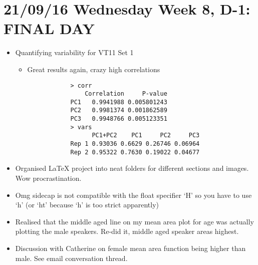 \documentclass{article}
\begin{document}
\section*{21/09/16 Wednesday Week 8, D-1: FINAL DAY}
\begin{itemize}
    \item Quantifying variability for VT11 Set 1
    \begin{itemize}
        \item Great results again, crazy high correlations\begin{verbatim}
            > corr
                Correlation     P-value
            PC1   0.9941988 0.005801243
            PC2   0.9981374 0.001862589
            PC3   0.9948766 0.005123351
            > vars
                  PC1+PC2    PC1     PC2     PC3
            Rep 1 0.93036 0.6629 0.26746 0.06964
            Rep 2 0.95322 0.7630 0.19022 0.04677
        \end{verbatim}
    \end{itemize}
    \item Organised LaTeX project into neat folders for different sections and images. Wow procrastination.
    \item Omg sidecap is not compatible with the float specifier `H' so you have to use `h' (or `ht' because `h' is too strict apparently)
    \item Realised that the middle aged line on my mean area plot for age was actually plotting the male speakers. Re-did it, middle aged speaker areas highest.
    \item Discussion with Catherine on female mean area function being higher than male. See email conversation thread.
\end{itemize}
\end{document}
